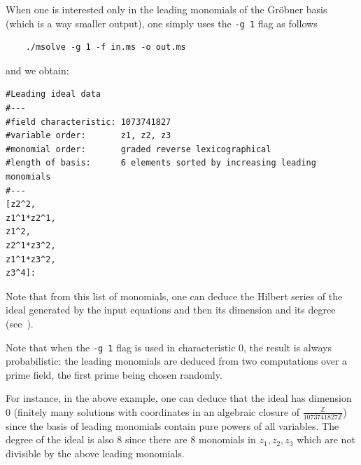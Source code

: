 \documentclass[a4paper,english,11pt]{scrartcl}
\theoremstyle{definition}
\theoremstyle{remark}
\begin{document}
When one is interested only in the leading monomials of the Gr\"obner basis
(which is a way smaller output), one simply uses the \verb+-g 1+ flag as follows
\begin{tcolorbox} %
  \begin{verbatim}
    ./msolve -g 1 -f in.ms -o out.ms
  \end{verbatim}
\end{tcolorbox}
and we obtain:
\begin{tcolorbox} %
  \begin{lstlisting}
#Leading ideal data
#---
#field characteristic: 1073741827
#variable order:       z1, z2, z3
#monomial order:       graded reverse lexicographical
#length of basis:      6 elements sorted by increasing leading monomials
#---
[z2^2,
z1^1*z2^1,
z1^2,
z2^1*z3^2,
z1^1*z3^2,
z3^4]:
  \end{lstlisting}
\end{tcolorbox}
Note that from this list of monomials, one can deduce the Hilbert series of the
ideal generated by the input equations and then its dimension and its degree
(see~\cite{CLO}).

Note that when the \verb+-g 1+ flag is used in characteristic $0$, the result is
always probabilistic: the leading monomials are deduced from two computations
over a prime field, the first prime being chosen randomly.

For instance, in the above example, one can deduce that the ideal has dimension
$0$ (finitely many solutions with coordinates in an algebraic closure of
$\frac{\mathbb{Z}}{1073741827\mathbb{Z}}$) since the basis of leading monomials
contain pure powers of all variables. The degree of the ideal is also $8$ since
there are $8$ monomials in $z_1, z_2, z_3$ which are not divisible by the above
leading monomials.
\end{document}
